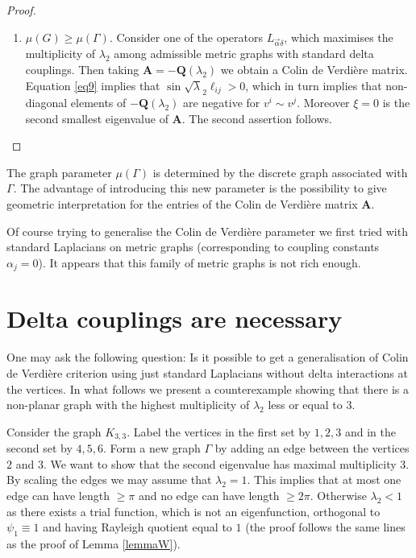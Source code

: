 \documentclass{amsart}
\theoremstyle{definition}
\theoremstyle{remark}
\numberwithin{equation}{section}
\begin{document}
\begin{proof}
\begin{enumerate}
\item $ \mu (G) \geq \mu(\Gamma) .$ Consider one of the operators $ L_{\vec{\alpha}\delta}$, which maximises 
the multiplicity of $ \lambda_2 $ among admissible metric graphs with standard delta couplings. Then taking
$ \mathbf{A} =  - \mathbf Q(\lambda_2) $
we obtain a Colin de Verdi{\`e}re matrix.
Equation \eqref{eq9}
 implies that $ \sin \sqrt{\lambda}_2 \ell_{ij} >0 $, which in turn implies that non-diagonal elements of $ -\mathbf Q(\lambda_2) $
 are negative for $ v^i \sim v^j$. Moreover $ \xi = 0 $ is the second smallest
eigenvalue of $ \mathbf{A}$. The second assertion follows.

\end{enumerate}

\end{proof}


The graph parameter $ \mu (\Gamma) $ is determined by the discrete graph associated with $ \Gamma$. The advantage 
of introducing this new parameter is the possibility to give geometric interpretation for the
entries of the Colin de Verdi\`ere matrix $ \mathbf A$.

Of course trying to generalise the Colin de Verdi\`ere parameter we first tried with standard Laplacians
on metric graphs (corresponding to coupling constants $ \alpha_j = 0$). It appears that this family of
metric graphs is not rich enough.



\section{Delta couplings are necessary} \label{SecDelta}

One may ask the following question: Is it possible to get a generalisation of Colin de Verdi{\`e}re criterion using just standard Laplacians without
delta interactions at the vertices. In what follows we present a counterexample showing that there is a non-planar graph with the highest
multiplicity of $ \lambda_2 $ less or equal to $3$.


Consider the graph $K_{3,3}$. Label the vertices in the first set by $1,2,3$ and in the second set by $4,5,6$. 
Form a new graph $\Gamma$ by adding an edge between the vertices $2$ and $3$. We want to show that the second eigenvalue has maximal multiplicity 3. 
By scaling the edges we may assume that $\lambda _2=1$. This implies that at most one edge can have length $\geq \pi$ and no edge can have length $\geq 2\pi$.
Otherwise $ \lambda_2 < 1 $ as there exists a trial function, which is not an eigenfunction, orthogonal to $ \psi_1 \equiv 1 $ and having Rayleigh quotient equal to $ 1$
(the proof follows the same lines as the proof of Lemma \ref{lemmaW}).
\vspace{-2mm}
\end{document}
